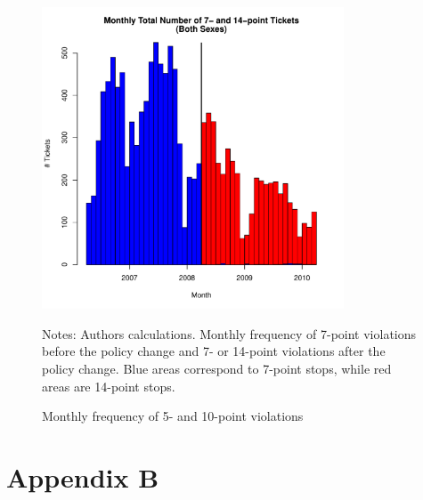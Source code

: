 \begin{figure}
\centering
\includegraphics[width=0.8\textwidth]{../Figures/num_pts_7_14_all_orig.pdf}
\caption{Monthly frequency of 5- and 10-point violations }
Notes: Authors calculations. Monthly frequency of 7-point violations before the policy change and 7- or 14-point violations after the policy change. Blue areas correspond to 7-point stops, while red areas are 14-point stops.
\label{fig:num_pts_7_14_all}
\end{figure}






% 
















\clearpage
\pagebreak

\section*{Appendix B}
\vspace{3.0in}


